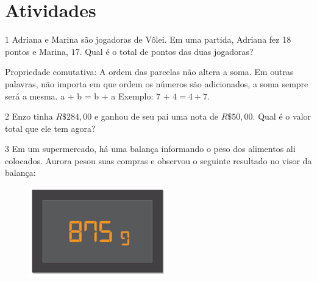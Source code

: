 






\section{Atividades}

\num{1} Adriana e Marina são jogadoras de Vôlei. Em uma partida, Adriana fez
18 pontos e Marina, $17$. Qual é o total de pontos das duas jogadoras?



\noindent Propriedade comutativa: A ordem das parcelas não
altera a soma. Em outras palavras, não importa em que ordem os números
são adicionados, a soma sempre será a mesma. a + b = b + a Exemplo: $7$ +
$4 = 4 + 7$.

\num{2}  Enzo tinha $R\$284,00$ e ganhou de seu pai uma nota de $R\$50,00$. Qual é
o valor total que ele tem agora?


\num{3}  Em um supermercado, há uma balança informando o peso dos alimentos
ali colocados. Aurora pesou suas compras e observou o seguinte resultado
no visor da balança:

\begin{figure}
\centering\includegraphics[width=2.33333in,height=1.53125in]{./imgSAEB_6_MAT/media/image23.png}
\end{figure}


